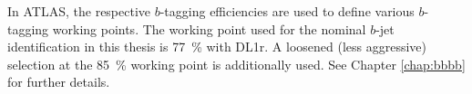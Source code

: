 In ATLAS, the respective $b$-tagging efficiencies are used to define various $b$-tagging 
working points. The working point used for the nominal $b$-jet identification in this 
thesis is 77~\% with DL1r. A loosened (less aggressive) selection at the 85~\% working point 
is additionally used. See Chapter \ref{chap:bbbb} for further details.

